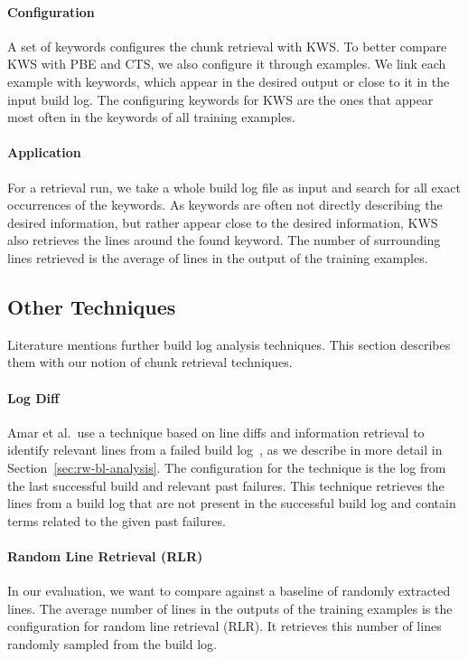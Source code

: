 \documentclass[\myrootdir/main.tex]{subfiles}
\begin{document}
\paragraph{Configuration}
A set of keywords configures the chunk retrieval with KWS\@.
To better compare KWS with PBE and CTS, we also configure it through examples.
We link each example with keywords, which appear in the desired output or close to it in the input build log.
The configuring keywords for KWS are the ones that appear most often in the keywords of all training examples.

\paragraph{Application}
For a retrieval run, we take a whole build log file as input and search for all exact occurrences of the keywords.
As keywords are often not directly describing the desired information, but rather appear close to the desired information, KWS also retrieves the lines around the found keyword.
The number of surrounding lines retrieved is the average of lines in the output of the training examples.

\subsection{Other Techniques}
\label{sec:expl-rlr}
Literature mentions further build log analysis techniques.
This section describes them with our notion of chunk retrieval techniques.

\paragraph{Log Diff}
Amar et al.\ use a technique based on line diffs and information retrieval to identify relevant lines from a failed build log~\cite{amar2019mining}, as we describe in more detail in Section~\ref{sec:rw-bl-analysis}.
The configuration for the technique is the log from the last successful build and relevant past failures.
This technique retrieves the lines from a build log that are not present in the successful build log and contain terms related to the given past failures.

\paragraph{Random Line Retrieval (RLR)}
In our evaluation, we want to compare against a baseline of randomly extracted lines.
The average number of lines in the outputs of the training examples is the configuration for random line retrieval (RLR).
It retrieves this number of lines randomly sampled from the build log.
\end{document}
